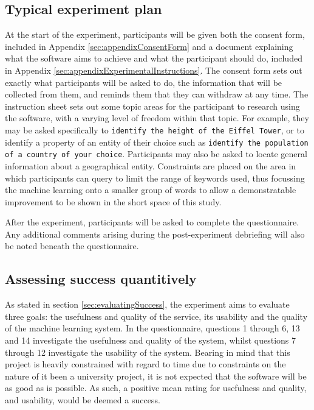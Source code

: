 \documentclass[authoryearcitations]{UoYCSproject}
\begin{document}
\subsection{Typical experiment plan}
\label{subsec:typicalExperiment}
At the start of the experiment, participants will be given both the consent form, included in Appendix \ref{sec:appendixConsentForm} and a document explaining what the software aims to achieve and what the participant should do, included in Appendix \ref{sec:appendixExperimentalInstructions}. The consent form sets out exactly what participants will be asked to do, the information that will be collected from them, and reminds them that they can withdraw at any time. The instruction sheet sets out some topic areas for the participant to research using the software, with a varying level of freedom within that topic. For example, they may be asked specifically to \texttt{identify the height of the Eiffel Tower}, or to identify a property of an entity of their choice such as \texttt{identify the population of a country of your choice}. Participants may also be asked to locate general information about a geographical entity. Constraints are placed on the area in which participants can query to limit the range of keywords used, thus focussing the machine learning onto a smaller group of words to allow a demonstratable improvement to be shown in the short space of this study.

After the experiment, participants will be asked to complete the questionnaire. Any additional comments arising during the post-experiment debriefing will also be noted beneath the questionnaire.

\subsection{Assessing success quantitively}
\label{subsec:assessingLearning}
As stated in section \ref{sec:evaluatingSuccess}, the experiment aims to evaluate three goals: the usefulness and quality of the service, its usability and the quality of the machine learning system. In the questionnaire, questions 1 through 6, 13 and 14 investigate the usefulness and quality of the system, whilst questions 7 through 12 investigate the usability of the system. Bearing in mind that this project is heavily constrained with regard to time due to constraints on the nature of it been a university project, it is not expected that the software will be as good as is possible. As such, a positive mean rating for usefulness and quality, and usability, would be deemed a success.
\end{document}
